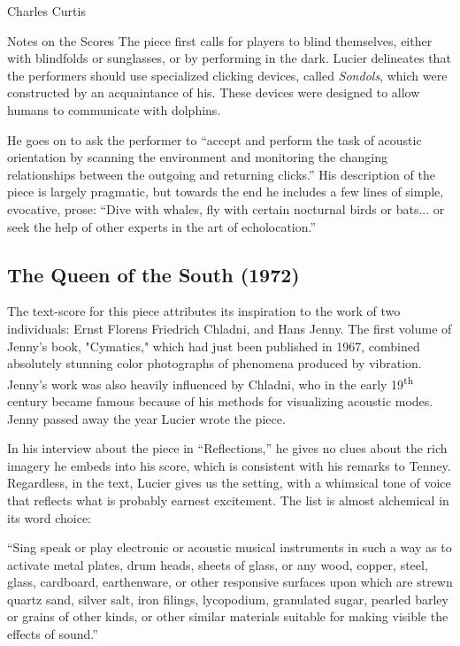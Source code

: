 \documentclass[a4paper,10pt]{report}
\numberwithin{equation}{section}
\begin{document}
\begin{chapter}{Charles Curtis}
\begin{section}{Notes on the Scores}
The piece first calls for players to blind themselves, either with blindfolds or sunglasses, or by performing in the dark. Lucier delineates that the performers should use specialized clicking devices, called \emph{Sondols}, which were constructed by an acquaintance of his. These devices were designed to allow humans to communicate with dolphins.

He goes on to ask the performer to ``accept and perform the task of acoustic orientation by scanning the environment and monitoring the changing relationships between the outgoing and returning clicks.''\cite[p.312]{lucier1995} His description of the piece is largely pragmatic, but towards the end he includes a few lines of simple, evocative, prose:
``Dive with whales, fly with certain nocturnal birds or bats... or seek the help of other experts in the art of echolocation.''\cite[p.~314]{lucier1995}


\subsection{The Queen of the South (1972)}

The text-score for this piece attributes its inspiration to the work of two individuals: Ernst Florens Friedrich Chladni, and Hans Jenny. The first volume of Jenny's book, "Cymatics," which had just been published in 1967, combined absolutely stunning color photographs of phenomena produced by vibration. Jenny's work was also heavily influenced by Chladni, who in the early 19\textsuperscript{th} century became famous because of his methods for visualizing acoustic modes. Jenny passed away the year Lucier wrote the piece. 

In his interview about the piece in ``Reflections,'' he gives no clues about the rich imagery he embeds into his score, which is consistent with his remarks to Tenney. Regardless, in the text, Lucier gives us the setting, with a whimsical tone of voice that reflects what is probably earnest excitement. The list is almost alchemical in its word choice: 

\begin{singlespace}
``Sing speak or play electronic or acoustic musical instruments in such a way as to activate metal plates, drum heads, sheets of glass, or any wood, copper, steel, glass, cardboard, earthenware, or other responsive surfaces upon which are strewn quartz sand, silver salt, iron filings, lycopodium, granulated sugar, pearled barley or grains of other kinds, or other similar materials suitable for making visible the effects of sound.''
\end{singlespace}


\end{section}
\end{chapter}
\end{document}
